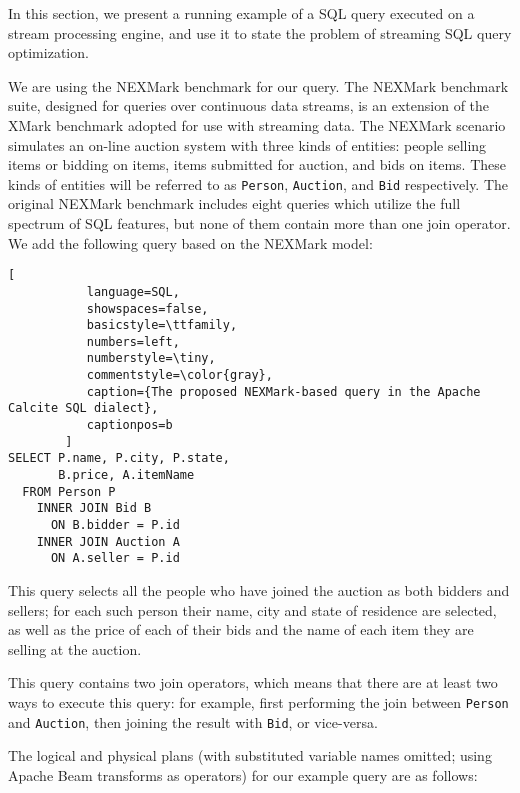 \label {sec:fs-optimization-problem-statement}

In this section, we present a running example of a SQL query executed on a stream processing engine, and use it to state the problem of streaming SQL query optimization.

We are using the NEXMark benchmark \cite{tucker2008nexmark} for our query. The NEXMark benchmark suite, designed for queries over continuous data streams, is an extension of the XMark benchmark \cite{schmidt2002xmark} adopted for use with streaming data. The NEXMark scenario simulates an on-line auction system with three kinds of entities: people selling items or bidding on items, items submitted for auction, and bids on items. These kinds of entities will be referred to as \texttt{Person}, \texttt{Auction}, and \texttt{Bid} respectively. The original NEXMark benchmark includes eight queries which utilize the full spectrum of SQL features, but none of them contain more than one join operator. We add the following query based on the NEXMark model: \\

\begin{lstlisting}[
           language=SQL,
           showspaces=false,
           basicstyle=\ttfamily,
           numbers=left,
           numberstyle=\tiny,
           commentstyle=\color{gray},
           caption={The proposed NEXMark-based query in the Apache Calcite SQL dialect}, 
           captionpos=b
        ]
SELECT P.name, P.city, P.state, 
       B.price, A.itemName 
  FROM Person P 
    INNER JOIN Bid B 
      ON B.bidder = P.id 
    INNER JOIN Auction A 
      ON A.seller = P.id
\end{lstlisting}

This query selects all the people who have joined the auction as both bidders and sellers; for each such person their name, city and state of residence are selected, as well as the price of each of their bids and the name of each item they are selling at the auction. 

This query contains two join operators, which means that there are at least two ways to execute this query: for example, first performing the join between \texttt{Person} and \texttt{Auction}, then joining the result with \texttt{Bid}, or vice-versa. 

The logical and physical plans (with substituted variable names omitted; using Apache Beam transforms as operators) for our example query are as follows: \\

